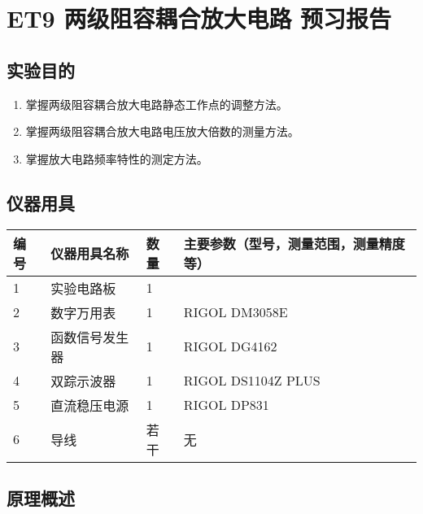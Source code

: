 \documentclass[dvipsnames, svgnames,a4paper,11pt]{article}
\begin{document}
	

	\clearpage
	\tableofcontents
	\clearpage
	
	
	
	
	\setcounter{section}{0}
	\section{ET9 两级阻容耦合放大电路 \quad\heiti 预习报告}
	
	\subsection{实验目的}
	\begin{enumerate}
		\item 掌握两级阻容耦合放大电路静态工作点的调整方法。
		\item 掌握两级阻容耦合放大电路电压放大倍数的测量方法。
		\item 掌握放大电路频率特性的测定方法。
		
	\end{enumerate}
	
	\subsection{仪器用具}
	\begin{table}[htbp]
		\centering
		\renewcommand\arraystretch{1.6}
		\begin{tabular}{p{}|p{}|p{}|p{}}
			\hline
			编号 & 仪器用具名称 & 数量 & 主要参数（型号，测量范围，测量精度等） \\
\hline
1 & 实验电路板 & 1 &  \\
2 & 数字万用表 & 1 & RIGOL DM3058E \\
3 & 函数信号发生器 & 1 & RIGOL DG4162 \\
4 & 双踪示波器 & 1 & RIGOL DS1104Z PLUS \\
5 & 直流稳压电源 & 1 & RIGOL DP831 \\
6 & 导线 & 若干 & 无 \\
			\hline
		\end{tabular}
	\end{table}
	
	\subsection{原理概述}
	
\end{document}
